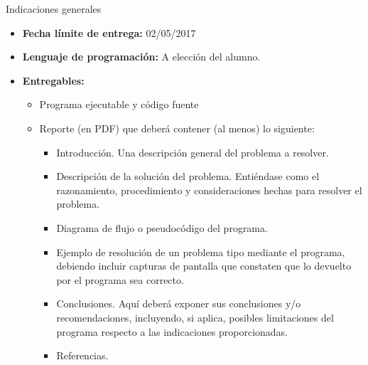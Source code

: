 \documentclass[12pt,letterpaper]{article}
\begin{document}
\begin{informacion}{Indicaciones generales}
\begin{itemize}[itemsep=0,label={o}]
\item \textbf{Fecha límite de entrega:} 02/05/2017
\item \textbf{Lenguaje de programación:} A elección del alumno.
\item \textbf{Entregables:}
    \begin{itemize}[itemsep=0,label={-}]
        \item Programa ejecutable y código fuente
        \item Reporte (en PDF) que deberá contener (al menos) lo siguiente:
            \begin{itemize}[itemsep=0,label={$\cdot$}]
                \item Introducción. Una descripción general del problema a resolver.
                \item Descripción de la solución del problema. Entiéndase como el razonamiento, procedimiento y consideraciones hechas para resolver el problema.
                \item Diagrama de flujo o pseudocódigo del programa. 
                \item Ejemplo de resolución de un problema tipo mediante el programa, debiendo incluir 
                capturas de pantalla que constaten que lo devuelto por el programa sea correcto.
                \item Conclusiones. Aquí deberá exponer sus conclusiones y/o recomendaciones, incluyendo, si aplica, 
                posibles limitaciones del programa respecto a las indicaciones proporcionadas.
                \item Referencias.
            \end{itemize}
    \end{itemize}
\end{itemize}
\end{informacion}
\end{document}
